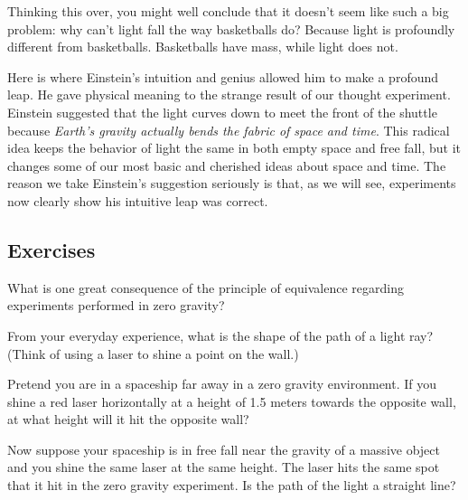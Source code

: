 \documentclass{article}
\numberwithin{equation}{section}
\numberwithin{figure}{section}
\begin{document}
Thinking this over, you might well conclude that it doesn't seem like such a big problem: why can't light fall the way basketballs do? Because light is profoundly different from basketballs. Basketballs have mass, while light does not.
\vspace{1em}

Here is where Einstein's intuition and genius allowed him to make a profound leap. He gave physical meaning to the strange result of our thought experiment. Einstein suggested that the light curves down to meet the front of the shuttle because \textit{Earth's gravity actually bends the fabric of space and time}. This radical idea keeps the behavior of light the same in both empty space and free fall, but it changes some of our most basic and cherished ideas about space and time. The reason we take Einstein's suggestion seriously is that, as we will see, experiments now clearly show his intuitive leap was correct.

\cyanhrule

\subsection*{Exercises}

\begin{exercise} \label{vEYTBu}
    What is one great consequence of the principle of equivalence regarding experiments performed in zero gravity?
\end{exercise}

\begin{exercise}
    From your everyday experience, what is the shape of the path of a light ray? (Think of using a laser to shine a point on the wall.)
\end{exercise}

\begin{exercise}
    Pretend you are in a spaceship far away in a zero gravity environment. If you shine a red laser horizontally at a height of 1.5 meters towards the opposite wall, at what height will it hit the opposite wall?
\end{exercise}

\begin{exercise}
    Now suppose your spaceship is in free fall near the gravity of a massive object and you shine the same laser at the same height. The laser hits the same spot that it hit in the zero gravity experiment. Is the path of the light a straight line?
\end{exercise}
\end{document}
